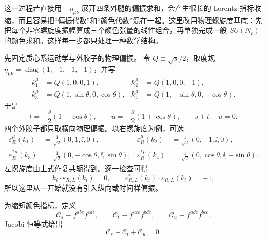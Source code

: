 \begin{derivation}
这一过程若直接用 $-\eta_{\mu\nu}$ 展开四条外腿的偏振求和，会产生很长的 Lorentz 指标收缩，而且容易把“偏振代数”和“颜色代数”混在一起。这里改用物理螺旋度基底：先把每个非零螺旋度振幅算成三个颜色张量的线性组合，再单独完成一般 $SU(N_c)$ 的颜色求和。这样每一步都只处理一种数学结构。

先固定质心系运动学与外胶子的物理偏振。
令 $Q\equiv\sqrt{s}/2$，取度规 $\eta_{\mu\nu}=\operatorname{diag}(1,-1,-1,-1)$，并写
\begin{align*}
 k_1^\mu&=Q(1,0,0,1),&
 k_2^\mu&=Q(1,0,0,-1),\\
 k_3^\mu&=Q(1,\sin\theta,0,\cos\theta),&
 k_4^\mu&=Q(1,-\sin\theta,0,-\cos\theta).
\end{align*}
于是
\begin{equation*}
 t=-\frac{s}{2}(1-\cos\theta),
 \qquad
 u=-\frac{s}{2}(1+\cos\theta),
 \qquad s+t+u=0.
\end{equation*}
四个外胶子都只取横向物理偏振。以右螺旋度为例，可选
\begin{align*}
 \varepsilon_R^\mu(k_1)&=\frac1{\sqrt2}(0,1,\ii,0),&
 \varepsilon_R^\mu(k_2)&=\frac1{\sqrt2}(0,-1,\ii,0),\\
 \varepsilon_R^{*\mu}(k_3)&=\frac1{\sqrt2}(0,-\cos\theta,\ii,\sin\theta),&
 \varepsilon_R^{*\mu}(k_4)&=\frac1{\sqrt2}(0,\cos\theta,\ii,-\sin\theta).
\end{align*}
左螺旋度由上式作复共轭得到。逐一检查可得
\begin{equation*}
 k_i\cdot\varepsilon_{R,L}(k_i)=0,
 \qquad
 \varepsilon_{R,L}^*(k_i)\cdot\varepsilon_{R,L}(k_i)=-1,
\end{equation*}
所以这里从一开始就没有引入纵向或时间样偏振。

为缩短颜色指标，定义
\begin{equation*}
 \mathcal C_s\equiv f^{abe}f^{cde},
 \qquad
 \mathcal C_t\equiv f^{ace}f^{bde},
 \qquad
 \mathcal C_u\equiv f^{ade}f^{bce}.
\end{equation*}
Jacobi 恒等式给出
\begin{equation*}
 \mathcal C_s-\mathcal C_t+\mathcal C_u=0.
\end{equation*}


\end{derivation}
